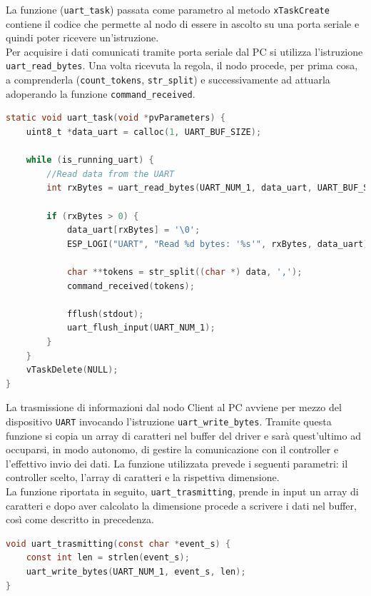 \noindent La funzione (\texttt{uart\_task}) passata come parametro al metodo \texttt{xTaskCreate} contiene il codice che permette al nodo di essere in ascolto su una porta seriale e quindi poter ricevere un'istruzione. \\
Per acquisire i dati comunicati tramite porta seriale dal PC si utilizza l'istruzione \texttt{uart\_read\_bytes}. Una volta ricevuta la regola, il nodo procede, per prima cosa, a comprenderla (\texttt{count\_tokens}, \texttt{str\_split}) e successivamente ad attuarla adoperando la funzione \texttt{command\_received}.\\
\begin{lstlisting}[language=C, caption= acquisizione dati attraverso il \texttt{UART}]
static void uart_task(void *pvParameters) {
    uint8_t *data_uart = calloc(1, UART_BUF_SIZE);

    while (is_running_uart) {
        //Read data from the UART
        int rxBytes = uart_read_bytes(UART_NUM_1, data_uart, UART_BUF_SIZE, 100 / portTICK_RATE_MS);

        if (rxBytes > 0) {
            data_uart[rxBytes] = '\0';
            ESP_LOGI("UART", "Read %d bytes: '%s'", rxBytes, data_uart);

            char **tokens = str_split((char *) data, ',');
            command_received(tokens);

            fflush(stdout);
            uart_flush_input(UART_NUM_1);
        }
    }
    vTaskDelete(NULL);
}
\end{lstlisting}

\noindent La trasmissione di informazioni dal nodo Client al PC avviene per mezzo del dispositivo \texttt{UART} invocando l'istruzione \texttt{uart\_write\_bytes}. Tramite questa funzione si copia un array di caratteri nel buffer del driver e sarà quest'ultimo ad occuparsi, in modo autonomo, di gestire la comunicazione con il controller e l'effettivo invio dei dati. La funzione utilizzata prevede i seguenti parametri: il controller scelto, l'array di caratteri e la rispettiva dimensione. \\
La funzione riportata in seguito, \texttt{uart\_trasmitting}, prende in input un array di caratteri e dopo aver calcolato la dimensione procede a scrivere i dati nel buffer, così come descritto in precedenza.\\

\begin{lstlisting}[language=C, caption= operazione di trasmissione dati tramite lo strumento \texttt{UART}]
void uart_trasmitting(const char *event_s) {
    const int len = strlen(event_s);
    uart_write_bytes(UART_NUM_1, event_s, len);
}
\end{lstlisting}


